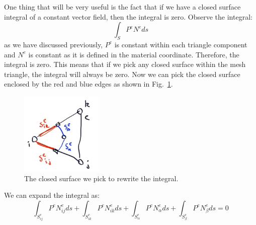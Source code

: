 \documentclass[acmtog]{acmart}
\begin{document}
One thing that will be very useful is the fact that if we have a closed surface integral of a constant vector field, then the integral is zero. Observe the integral:
\begin{equation*}
  \int_{S} P^e N^e ds
\end{equation*}
as we have discussed previously, $P^e$ is constant within each triangle component and $N^e$ is constant as it is defined in the material coordinate. Therefore, the integral is zero. This means that if we pick any closed surface within the mesh triangle, the integral will always be zero. Now we can pick the closed surface enclosed by the red and blue edges as shown in Fig.~\ref{fig:rewrite}.

\begin{figure}[H]
  \centering
  \includegraphics[width=0.35\textwidth]{images/rewrite.png}
  \caption{The closed surface we pick to rewrite the integral.}
  \label{fig:rewrite}
\end{figure}

We can expand the integral as:
\begin{equation*}
  \int_{S_{ij}^e} P^e N_{ij}^e ds + \int_{S_{ik}^e} P^e N_{ik}^e ds + \int_{S_{\alpha}^e} P^e N_{\alpha}^e ds + \int_{S_{\beta}^e} P^e N_{\beta}^e ds = 0
\end{equation*}
\end{document}
